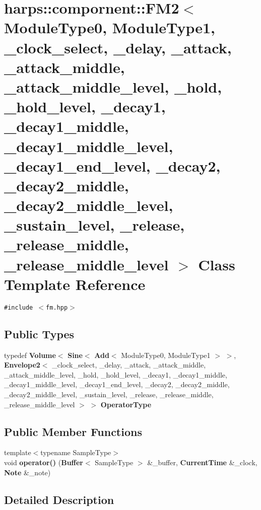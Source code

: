 \section{harps::compornent::FM2$<$ ModuleType0, ModuleType1, \_\-clock\_\-select, \_\-delay, \_\-attack, \_\-attack\_\-middle, \_\-attack\_\-middle\_\-level, \_\-hold, \_\-hold\_\-level, \_\-decay1, \_\-decay1\_\-middle, \_\-decay1\_\-middle\_\-level, \_\-decay1\_\-end\_\-level, \_\-decay2, \_\-decay2\_\-middle, \_\-decay2\_\-middle\_\-level, \_\-sustain\_\-level, \_\-release, \_\-release\_\-middle, \_\-release\_\-middle\_\-level $>$ Class Template Reference}
\label{classharps_1_1compornent_1_1FM2}
{\tt \#include $<$fm.hpp$>$}

\subsection*{Public Types}
\begin{CompactItemize}
\item 
typedef {\bf Volume}$<$ {\bf Sine}$<$ {\bf Add}$<$ ModuleType0, ModuleType1 $>$ $>$, {\bf Envelope2}$<$ \_\-clock\_\-select, \_\-delay, \_\-attack, \_\-attack\_\-middle, \_\-attack\_\-middle\_\-level, \_\-hold, \_\-hold\_\-level, \_\-decay1, \_\-decay1\_\-middle, \_\-decay1\_\-middle\_\-level, \_\-decay1\_\-end\_\-level, \_\-decay2, \_\-decay2\_\-middle, \_\-decay2\_\-middle\_\-level, \_\-sustain\_\-level, \_\-release, \_\-release\_\-middle, \_\-release\_\-middle\_\-level $>$ $>$ \textbf{OperatorType}\label{classharps_1_1compornent_1_1FM2_2435f01d3a078c2bfea1019d9014e9dc}

\end{CompactItemize}
\subsection*{Public Member Functions}
\begin{CompactItemize}
\item 
{\footnotesize template$<$typename SampleType$>$ }\\void \textbf{operator()} ({\bf Buffer}$<$ SampleType $>$ \&\_\-buffer, {\bf CurrentTime} \&\_\-clock, {\bf Note} \&\_\-note)\label{classharps_1_1compornent_1_1FM2_3b0e94c69fc8176384827c41fa901ef7}

\end{CompactItemize}


\subsection{Detailed Description}
